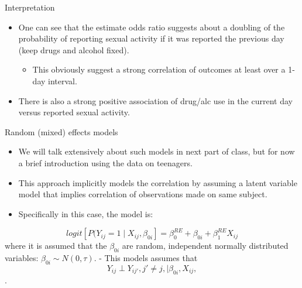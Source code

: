 \documentclass[ignorenonframetext,]{beamer}
\providecommand{\tightlist}{%
  \setlength{\itemsep}{0pt}\setlength{\parskip}{0pt}}
\begin{document}
\begin{frame}{Interpretation}

\begin{itemize}
\tightlist
\item
  One can see that the estimate odds ratio suggests about a doubling of
  the probability of reporting sexual activity if it was reported the
  previous day (keep drugs and alcohol fixed).

  \begin{itemize}
  \tightlist
  \item
    This obviously suggest a strong correlation of outcomes at least
    over a 1-day interval.
  \end{itemize}
\item
  There is also a strong positive association of drug/alc use in the
  current day versus reported sexual activity.
\end{itemize}

\end{frame}

\begin{frame}{Random (mixed) effects models}

\begin{itemize}
\tightlist
\item
  We will talk extensively about such models in next part of class, but
  for now a brief introduction using the data on teenagers.\\
\item
  This approach implicitly models the correlation by assuming a latent
  variable model that implies correlation of observations made on same
  subject.
\item
  Specifically in this case, the model is:
\end{itemize}

\[logit[P(Y_{ij}=1 \mid X_{ij}, \beta_{0i}] = \beta_0^{RE}+\beta_{0i}+\beta_1^{RE}X_{ij}\]
where it is assumed that the \(\beta_{0i}\) are random, independent
normally distributed variables: \(\beta_{0i} \sim N(0, \tau)\). - This
models assumes that
\[Y_{ij} \perp Y_{ij'}, j' \ne j,  \mid \beta_{0i},X_{ij},\].

\end{frame}
\end{document}
